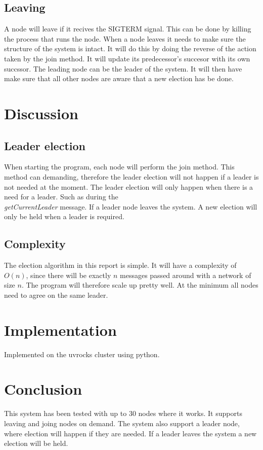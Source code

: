 \subsection{Leaving}
A node will leave if it recives the SIGTERM signal. This can be done by killing the process that runs the node.
When a node leaves it needs to make sure the structure of the system is intact. It will do this by doing the reverse of the action taken by the
join method. It will update its predecessor's succesor with its own succssor. The leading node can be the leader of the system. It will then have make sure that all other nodes are aware that a new election has be done.

\section{Discussion}
\subsection{Leader election}
When starting the program, each node will perform the join method. This method can demanding, therefore the leader election will not happen if a leader is not needed at the moment. The leader election will only happen when there is a need for a leader. Such as during the \textit{\\getCurrentLeader} message. If a leader node leaves the system. A new election will only be held when a leader is required.

\subsection{Complexity}
The election algorithm in this report is simple. It will have a complexity of $O(n)$, since there will be exactly $n$ messages passed around with a network of size $n$. The program will therefore scale up pretty well. At the minimum all nodes need to agree on the same leader.


\section{Implementation}
Implemented on the uvrocks cluster using python.

\section{Conclusion}
This system has been tested with up to 30 nodes where it works. It supports leaving and joing nodes on demand.
The system also support a leader node, where election will happen if they are needed. If a leader leaves the system a new election will be held.






